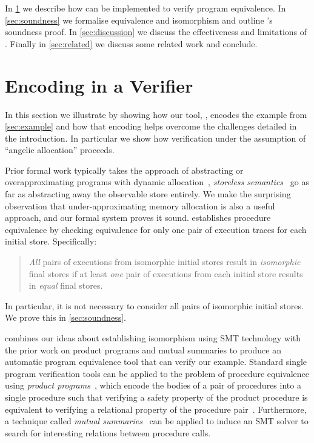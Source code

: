 \documentclass[runningheads,a4paper]{llncs}
\begin{document}
In \cref{sec:impl} we describe how \metho{} can be implemented to verify program equivalence. In \cref{sec:soundness} we formalise equivalence and isomorphism and outline \metho{}'s soundness proof. In \cref{sec:discussion} we discuss the effectiveness and limitations of \metho{}. Finally in \cref{sec:related} we discuss some related work and conclude.

\section{Encoding in a Verifier}\label{sec:impl}

In this section we illustrate \metho{} by showing how our tool, \tool{}, encodes the example from \cref{sec:example} and how that encoding helps overcome the challenges detailed in the introduction. In particular we show how verification under the assumption of ``angelic allocation'' proceeds. 

Prior formal work typically takes the approach of abstracting or overapproximating programs with dynamic allocation~\cite{Tennent2000,Koutavas2006,Benton2007,Tzevelekos2012}, \emph{storeless semantics}~\cite{Bozga2003} go as far as abstracting away the observable store entirely. We make the surprising observation that under-approximating memory allocation is also a useful approach, and our formal system proves it sound. \metho{} establishes procedure equivalence by checking equivalence for only one pair of execution traces for each initial store. Specifically: \begin{quote}\emph{All} pairs of executions from isomorphic initial stores result in \emph{isomorphic} final stores if at least \emph{one} pair of executions from each initial store results in \emph{equal} final stores.\end{quote} In particular, it is not necessary to consider all pairs of isomorphic initial stores. We prove this in \cref{sec:soundness}.

\metho{} combines our ideas about establishing isomorphism using SMT technology with the prior work on product programs and mutual summaries to produce an automatic program equivalence tool that can verify our example. Standard single program verification tools can be applied to the problem of procedure equivalence using \emph{product programs}~\cite{Barthe2004,Terauchi2005,Godlin09,Lahiri2012,Barthe2016}, which encode the bodies of a pair of procedures into a single procedure such that verifying a safety property of the product procedure is equivalent to verifying a relational property of the procedure pair~\cite{Barthe2016}. Furthermore, a technique called \emph{mutual summaries}~\cite{Hawblitzel2013} can be applied to induce an SMT solver to search for interesting relations between procedure calls. 
\end{document}
